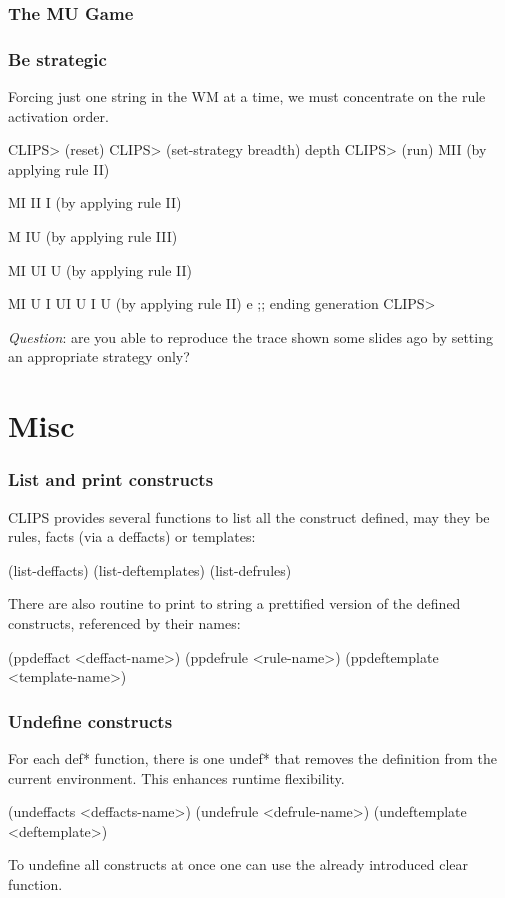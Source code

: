 \documentclass[xcolor={usenames,dvipsnames,svgnames}, compress]{beamer}
\begin{document}
\begin{frame}[fragile]
  \frametitle{The MU Game}
  \frametitle{Be strategic}
  Forcing just one string in the WM at a time, we must concentrate on
  the rule activation order.
  \begin{clips-code}
    CLIPS> (reset)
    CLIPS> (set-strategy breadth)
    depth
    CLIPS> (run)
    MII (by applying rule II)

    MI II I (by applying rule II)

    M IU (by applying rule III)

    MI UI U (by applying rule II)

    MI U I UI U I U (by applying rule II)
    e ;; ending generation
    CLIPS>
  \end{clips-code}

  \emph{Question}: are you able to reproduce the trace shown some slides ago by setting
  an appropriate strategy only?
\end{frame}

\section{Misc}
{
  \begin{frame}
    \sectionpage
  \end{frame}
}

\begin{frame}[fragile]
  \frametitle{List and print constructs}
  CLIPS provides several functions to list all the construct defined,
  may they be rules, facts (via a deffacts) or templates:
  \begin{clips-code}
    (list-deffacts)
    (list-deftemplates)
    (list-defrules)
  \end{clips-code}\bigskip

  There are also routine to print to string a prettified version of
  the defined constructs, referenced by their names:

  \begin{clips-code}
    (ppdeffact <deffact-name>)
    (ppdefrule <rule-name>)
    (ppdeftemplate <template-name>)
  \end{clips-code}
\end{frame}

\begin{frame}[fragile]
  \frametitle{Undefine constructs}
  For each \textsf{def*} function, there is one \textsf{undef*} that
  removes the definition from the current environment. This enhances
  runtime flexibility.
  \begin{clips-code}[numbers=none]
    (undeffacts <deffacts-name>)
    (undefrule <defrule-name>)
    (undeftemplate <deftemplate>)
  \end{clips-code}\bigskip
  
  To undefine all constructs at once one can use the already
  introduced \textsf{clear} function.
\end{frame}
\end{document}
